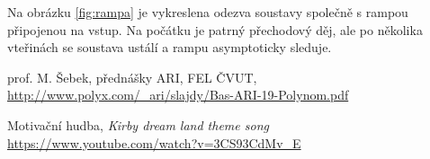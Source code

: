 \documentclass[twoside]{article}
\begin{document}
Na obrázku \ref{fig:rampa} je vykreslena odezva soustavy společně s rampou připojenou na vstup.
Na počátku je patrný přechodový děj, ale po několika vteřinách se soustava ustálí a rampu asymptoticky sleduje.

\begin{thebibliography}{9}


		prof. M. Šebek, přednášky ARI, FEL ČVUT, \url{http://www.polyx.com/_ari/slajdy/Bas-ARI-19-Polynom.pdf}
	
		Motivační hudba, \emph{Kirby dream land theme song} \url{https://www.youtube.com/watch?v=3CS93CdMv_E}
	
	\end{thebibliography}
\end{document}
